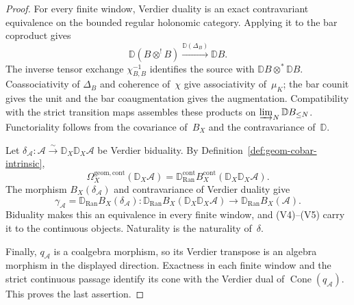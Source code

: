 \begin{proof}
For every finite window, Verdier duality is an exact contravariant
equivalence on the bounded regular holonomic category.  Applying it to
the bar coproduct gives
\[
\mathbb D(B\otimes^!B)\xrightarrow{\mathbb D(\Delta_B)}\mathbb DB.
\]
The inverse tensor exchange $\chi_{B,B}^{-1}$ identifies the source
with $\mathbb DB\otimes^*\mathbb DB$.  Coassociativity of
$\Delta_B$ and coherence of~$\chi$ give associativity of~$\mu_K$;
the bar counit gives the unit and the bar coaugmentation gives the
augmentation. Compatibility with the strict
transition maps assembles these products on
$\varinjlim_N\mathbb DB_{\leq N}$.  Functoriality follows from the
covariance of~$B_X$ and the contravariance of~$\mathbb D$.

Let
$\delta_{\mathcal A}\colon\mathcal A\xrightarrow{\sim}
\mathbb D_X\mathbb D_X\mathcal A$ be Verdier biduality.  By
Definition~\ref{def:geom-cobar-intrinsic},
\[
\Omega_X^{\mathrm{geom,cont}}(\mathbb D_X\mathcal A)
=
\mathbb D_{\operatorname{Ran}}^{\mathrm{cont}}
B_X^{\mathrm{cont}}(\mathbb D_X\mathbb D_X\mathcal A).
\]
The morphism $B_X(\delta_{\mathcal A})$ and contravariance of Verdier
duality give
\[
\gamma_{\mathcal A}
=\mathbb D_{\operatorname{Ran}}B_X(\delta_{\mathcal A})\colon
\mathbb D_{\operatorname{Ran}}B_X(\mathbb D_X\mathbb D_X\mathcal A)
\longrightarrow
\mathbb D_{\operatorname{Ran}}B_X(\mathcal A).
\]
Biduality makes this an equivalence in every finite window, and
\textup{(V4)--(V5)} carry it to the continuous objects.  Naturality is the
naturality of~$\delta$.

Finally, $q_{\mathcal A}$ is a coalgebra morphism, so its Verdier
transpose is an algebra morphism in the displayed direction.  Exactness
in each finite window and the strict continuous passage identify its
cone with the Verdier dual of $\operatorname{Cone}(q_{\mathcal A})$.
This proves the last assertion.
\end{proof}


